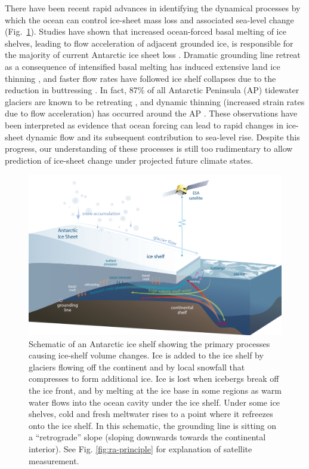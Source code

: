 There have been recent rapid advances in identifying the dynamical processes by which the
ocean can control ice-sheet mass loss and associated sea-level change (Fig.~\ref{fig:ice-shelf-schematic}). Studies have shown that
increased ocean-forced basal melting of ice shelves, leading to flow acceleration of adjacent grounded ice,
is responsible for the majority of current Antarctic ice sheet loss \parencite{Rignot2008,
Pritchard2009}. Dramatic grounding line retreat as a consequence
of intensified basal melting has induced extensive land ice thinning \parencite{Wingham2009,
Pritchard2009, Rignot2014}, and faster flow rates have followed ice shelf collapses
due to the reduction in buttressing \parencite{Rignot2004, Scambos2004}.
In fact, 87\% of all Antarctic Peninsula (AP) tidewater glaciers are known to be retreating
\parencite{Cook2005}, and dynamic thinning (increased strain rates due to flow acceleration)
has occurred around the AP \parencite{Rignot2008, Pritchard2009}.
These observations have been interpreted as evidence that
ocean forcing can lead to rapid changes in ice-sheet dynamic flow and its subsequent
contribution to sea-level rise. Despite this progress, our understanding of these processes
is still too rudimentary to allow prediction of ice-sheet change under projected
future climate states.


\begin{figure}[!ht]
  \centering
  \includegraphics[width=.9\textwidth]{img/ice_shelf_diagram.png}
  \caption[Schematic of an Antarctic ice shelf showing the primary]{
  \ssp \footnotesize
Schematic of an Antarctic ice shelf showing the primary processes causing ice-shelf volume changes. Ice is added to the ice shelf by glaciers flowing off the continent and by local snowfall that compresses to form additional ice. Ice is lost when icebergs break off the ice front, and by melting at the ice base in some regions as warm water flows into the ocean cavity under the ice shelf. Under some ice shelves, cold and fresh meltwater rises to a point where it refreezes onto the ice shelf. In this schematic, the grounding line is sitting on a ``retrograde'' slope (sloping downwards towards the continental interior). See Fig. \ref{fig:ra-principle} for explanation of satellite measurement.
  }
  \label{fig:ice-shelf-schematic}
\end{figure}

